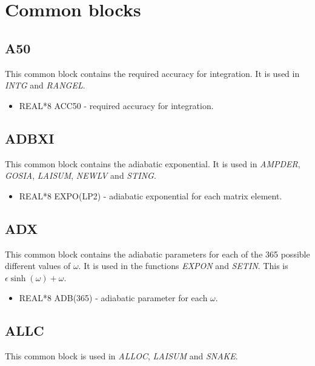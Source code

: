 \chapter{Common blocks}

\section{A50}

This common block contains the required accuracy for integration. It is used
in \emph{INTG} and \emph{RANGEL}.

\begin{itemize}
\item REAL*8 ACC50 - required accuracy for integration.
\end{itemize}

\section{ADBXI}

This common block contains the adiabatic exponential. It is used in \emph{
AMPDER}, \emph{GOSIA}, \emph{LAISUM}, \emph{NEWLV} and \emph{STING}.

\begin{itemize}
\item REAL*8 EXPO(LP2) - adiabatic exponential for each matrix element.
\end{itemize}

\section{ADX}

This common block contains the adiabatic parameters for each of the 365
possible different values of $\omega$. It is used in the functions \emph{
EXPON} and \emph{SETIN}. This is $\epsilon \sinh(\omega) + \omega$.\\

\begin{itemize}
\item REAL*8 ADB(365) - adiabatic parameter for each $\omega$.
\end{itemize}

\section{ALLC}

This common block is used in \emph{ALLOC}, \emph{LAISUM} and \emph{SNAKE}.

